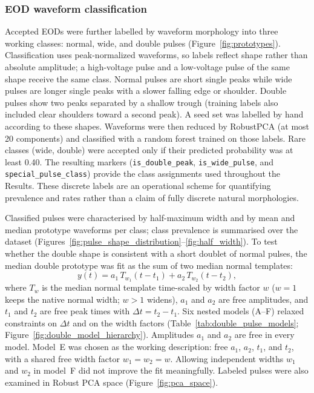 \subsubsection{EOD waveform classification}
\label{sec:waveform_classification}

Accepted EODs were further labelled by waveform morphology into three working classes: normal, wide, and double pulses (Figure~\ref{fig:prototypes}).
Classification uses peak-normalized waveforms, so labels reflect shape rather than absolute amplitude; a high-voltage pulse and a low-voltage pulse of the same shape receive the same class.
Normal pulses are short single peaks while wide pulses are longer single peaks with a slower falling edge or shoulder. 
Double pulses show two peaks separated by a shallow trough (training labels also included clear shoulders toward a second peak).
A seed set was labelled by hand according to these shapes.
Waveforms were then reduced by RobustPCA (at most 20 components) and classified with a random forest trained on those labels.
Rare classes (wide, double) were accepted only if their predicted probability was at least 0.40.
The resulting markers (\texttt{is\_double\_peak}, \texttt{is\_wide\_pulse}, and \texttt{special\_pulse\_class}) provide the class assignments used throughout the Results.
These discrete labels are an operational scheme for quantifying prevalence and rates rather than a claim of fully discrete natural morphologies.

Classified pulses were characterised by half-maximum width and by mean and median prototype waveforms per class; class prevalence is summarised over the dataset (Figures~\ref{fig:pulse_shape_distribution}--\ref{fig:half_width}).
To test whether the double shape is consistent with a short doublet of normal pulses, the median double prototype was fit as the sum of two median normal templates:
\begin{equation}
  y(t) = a_1\,T_{w_1}(t-t_1) + a_2\,T_{w_2}(t-t_2),
\end{equation}
where $T_w$ is the median normal template time-scaled by width factor $w$ ($w=1$ keeps the native normal width; $w>1$ widens), $a_1$ and $a_2$ are free amplitudes, and $t_1$ and $t_2$ are free peak times with $\Delta t = t_2-t_1$.
Six nested models (A--F) relaxed constraints on $\Delta t$ and on the width factors (Table~\ref{tab:double_pulse_models}; Figure~\ref{fig:double_model_hierarchy}).
Amplitudes $a_1$ and $a_2$ are free in every model.
Model~E was chosen as the working description: free $a_1$, $a_2$, $t_1$, and $t_2$, with a shared free width factor $w_1=w_2=w$.
Allowing independent widths $w_1$ and $w_2$ in model~F did not improve the fit meaningfully.
Labeled pulses were also examined in Robust PCA space (Figure~\ref{fig:pca_space}).

